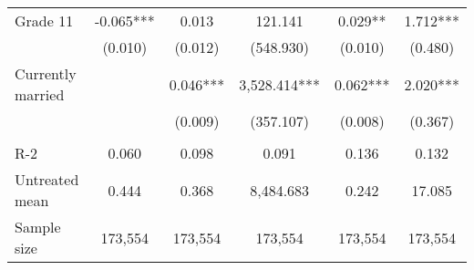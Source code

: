 \begin{tabular}{lccccc}
 \hspace{0.3cm} Grade 11   & -0.065***   & 0.013   & 121.141   & 0.029**   & 1.712***  \\
 & (0.010)   & (0.012)   & (548.930)   & (0.010)   & (0.480)  \\
 Currently married   &   & 0.046***   & 3,528.414***   & 0.062***   & 2.020***  \\
 &    & (0.009)   & (357.107)   & (0.008)   & (0.367)  \\
\\
R-2 & 0.060 & 0.098 & 0.091 & 0.136 & 0.132 \\
Untreated mean & 0.444 & 0.368 & 8,484.683 & 0.242 & 17.085 \\
Sample size & 173,554 & 173,554 & 173,554 & 173,554  & 173,554 \\
\bottomrule
\bottomrule
\end{tabular}